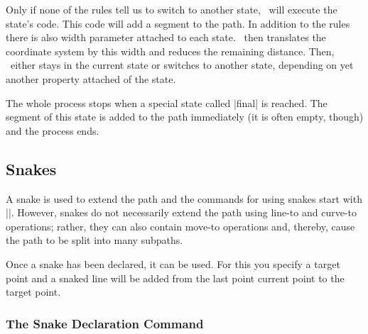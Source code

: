 Only if none of the rules tell us to switch to another
state, \pgfname\ will execute the state's code. This code will add a
segment to the path. In addition to the rules there is also width
parameter attached to each state. \pgfname\ then translates the
coordinate system by this width and reduces the remaining distance.
Then, \pgfname\ either stays in the current state or switches to
another state, depending on yet another property attached of the
state.

The whole process stops when a special state called |final| is
reached. The segment of this state is added to the path immediately
(it is often empty, though) and the process ends.


\subsection{Snakes}

\label{section-base-snakes}

A snake is used to extend the path and the
commands for using snakes start with |\pgfpath|. However, snakes do
not necessarily extend the path using line-to and curve-to operations;
rather, they can also contain move-to operations and, thereby, cause
the path to be split into many subpaths.

Once a snake has been declared, it can be used. For this you specify a
target point and a snaked line will be added from the last point
current point to the target point.

\subsubsection{The Snake Declaration Command}

